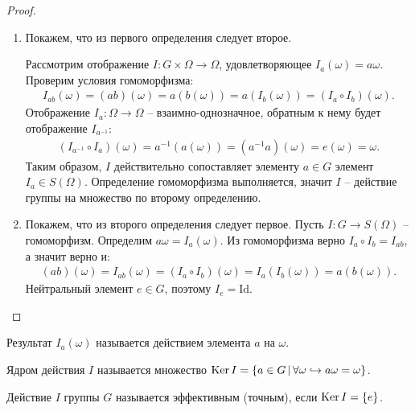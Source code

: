 \begin{proof}~
    \begin{enumerate}
        \item Покажем, что из первого определения следует второе.
        
        Рассмотрим отображение $I: G \times \Omega \to \Omega$, удовлетворяющее $I_a(\omega) = a \omega$.
        Проверим условия гомоморфизма:
        \begin{gather*}
            I_{ab}(\omega) = (ab)(\omega) = a(b(\omega)) = a(I_b(\omega)) = (I_a \circ I_b)(\omega).
        \end{gather*}
        Отображение $I_a: \Omega \to \Omega$ -- взаимно-однозначное, обратным к нему 
        будет отображение $I_{a^{-1}}$:
        \begin{gather*}
            (I_{a^{-1}} \circ I_a)(\omega) = a^{-1}(a(\omega)) = (a^{-1}a)(\omega) = e(\omega) = \omega.
        \end{gather*}
        Таким образом, $I$ действительно сопоставляет элементу $a \in G$ элемент $I_a \in S(\Omega)$.
        Определение гомоморфизма выполняется, значит $I$ -- действие группы на множество по второму определению.
        \item Покажем, что из второго определения следует первое.
        Пусть $I: G \to S(\Omega)$ -- гомоморфизм. Определим $a\omega = I_a(\omega)$. 
        Из гомоморфизма верно $I_a \circ I_b = I_{ab}$, а значит верно и:
        \begin{gather*}
            (ab)(\omega) = I_{ab}(\omega) = (I_a \circ I_b)(\omega) = I_a(I_b(\omega)) = a(b(\omega)).
        \end{gather*}
        Нейтральный элемент $e \in G$, поэтому $I_e = \text{Id}$.
    \end{enumerate}
\end{proof}

\begin{definition}
    Результат $I_a(\omega)$ называется действием элемента $a$ на $\omega$.
\end{definition}

\begin{definition}
    Ядром действия $I$ называется множество $\operatorname{Ker} I = \{a \in G \, | \, \forall \omega 
    \hookrightarrow a\omega = \omega\}$.
\end{definition}

\begin{definition}
    Действие $I$ группы $G$ называется эффективным (точным), если $\operatorname{Ker} I = \{e\}$.
\end{definition}

